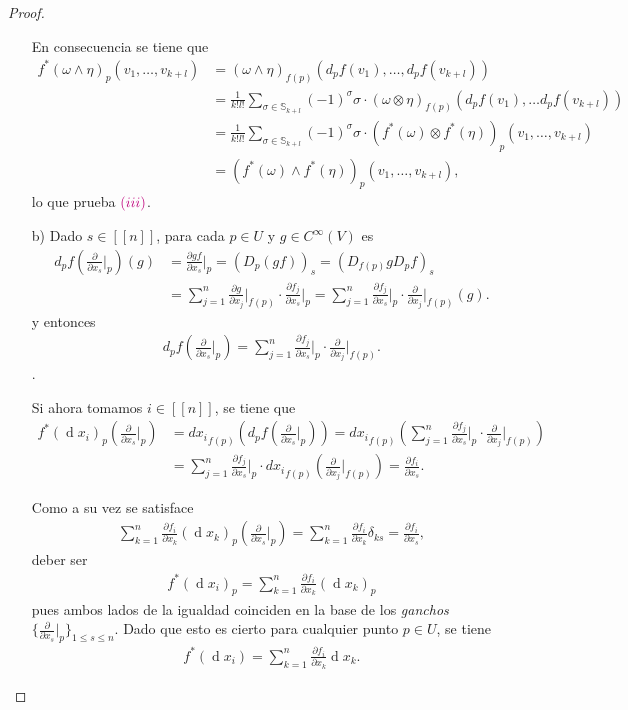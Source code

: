 \documentclass[11pt]{article}
\newcommand{\Ss}{\mathbb{S}}
\newcommand{\nat}[1]{[\![#1]\!]}
\renewcommand{\d}{\operatorname{d}}
\newcommand{\paint}[1]{\color{color}{#1}}
\begin{document}
\begin{proof}
\begin{itemize}[listparindent = \parindent]
En consecuencia se tiene que
\begin{align*}
f^*(\omega \wedge \eta)_p(v_1, \dots, v_{k+l}) &= (\omega \wedge \eta)_{f(p)}(d_pf(v_1), \dots, d_pf(v_{k+l}))\\
&= \frac{1}{k!l!}\sum_{\sigma \in \Ss_{k+l}}(-1)^\sigma \sigma \cdot (\omega \otimes \eta)_{f(p)} (d_pf(v_1), \dots d_pf(v_{k+l}))\\
& = \frac{1}{k!l!}\sum_{\sigma \in \Ss_{k+l}}(-1)^\sigma \sigma \cdot (f^*(\omega) \otimes f^*(\eta))_p(v_{1},\dots, v_{k+l})\\
&= (f^*(\omega) \wedge f^*(\eta))_p (v_{1},\dots, v_{k+l}),
\end{align*}
lo que prueba $\paint{(iii)}$.
\item[b)] Dado $s \in \nat{n}$, para cada $p \in U$ y $g \in C^\infty(V)$ es
\begin{align*}
d_pf\left(\frac{\partial}{\partial x_s}\Big|_p\right)(g) &= \frac{\partial gf}{\partial x_s}\Big|_p = (D_p(gf))_s = (D_{f(p)}gD_pf)_s\\
& = \sum_{j = 1}^n\frac{\partial g}{\partial x_j}\Big|_{f(p)} \cdot \frac{\partial f_j}{\partial x_s}\Big|_p = \sum_{j = 1}^n\frac{\partial f_j}{\partial x_s}\Big|_p\cdot \frac{\partial}{\partial x_j}\Big|_{f(p)}(g).
\end{align*}
y entonces
\begin{align*}
d_pf\left(\frac{\partial}{\partial x_s}\Big|_p\right) = \sum_{j = 1}^n\frac{\partial f_j}{\partial x_s}\Big|_p\cdot \frac{\partial}{\partial x_j}\Big|_{f(p)}.
\end{align*}.

Si ahora tomamos $i \in \nat{n}$, se tiene que
\begin{align*}
f^*(\d x_i)_p\left(\frac{\partial}{\partial x_s}\Big|_p\right) &= d{x_i}_{f(p)}\left(d_pf\left(\frac{\partial}{\partial x_s}\Big|_p\right)\right) = d{x_i}_{f(p)}\left(\sum_{j = 1}^n\frac{\partial f_j}{\partial x_s}\Big|_p\cdot \frac{\partial}{\partial x_j}\Big|_{f(p)}\right)\\
& = \sum_{j = 1}^n\frac{\partial f_j}{\partial x_s}\Big|_p\cdot d{x_i}_{f(p)}\left(\frac{\partial}{\partial x_j}\Big|_{f(p)}\right) = \frac{\partial f_i}{\partial x_s}.
\end{align*}

Como a su vez se satisface
\begin{align*}
\sum_{k=1}^n\frac{\partial f_i}{\partial x_k}(\d {x_k})_p\left(\frac{\partial}{\partial x_s}\Big|_{p}\right) = \sum_{k=1}^n\frac{\partial f_i}{\partial x_k}\delta_{ks} = \frac{\partial f_i}{\partial x_s},
\end{align*}
deber ser 
\begin{align*}
f^*(\d x_i)_p = \sum_{k=1}^n\frac{\partial f_i}{\partial x_k}(\d {x_k})_{p}
\end{align*}
pues ambos lados de la igualdad coinciden en la base de los \textit{ganchos} $\{\frac{\partial}{\partial x_s}|_p\}_{1 \leq s \leq n}$. Dado que esto es cierto para cualquier punto $p \in U$, se tiene
\begin{align}
f^*(\d x_i) = \sum_{k=1}^n\frac{\partial f_i}{\partial x_k}\d {x_k}.
\end{align}


\end{itemize}
\end{proof}
\end{document}
